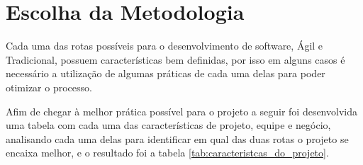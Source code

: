 \section{Escolha da Metodologia}

Cada uma das rotas possíveis para o desenvolvimento de software, Ágil e Tradicional, possuem características bem definidas, por isso em alguns casos é necessário a utilização de algumas práticas de cada uma delas para poder otimizar o processo.

Afim de chegar à melhor prática possível para o projeto a seguir foi desenvolvida uma tabela com cada uma das características de projeto, equipe e negócio, analisando cada uma delas para identificar em qual das duas rotas o projeto se encaixa melhor, e o resultado foi a tabela \ref{tab:caracteristcas_do_projeto}.

